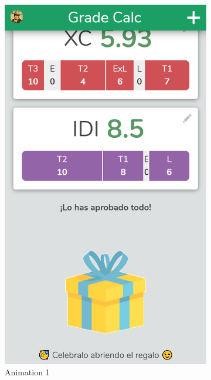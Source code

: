 \begin{figure}[htbp!]
    \centering
    \begin{subfigure}[b]{0.23\textwidth-0.1cm}
        \centering
        \includegraphics[width=\textwidth]{media/screenshots/screenshot-gift-1.png}
        \caption{Animation 1}
    \end{subfigure}
    \begin{subfigure}[b]{0.23\textwidth-0.1cm}
        \centering

\end{subfigure}
\end{figure}

